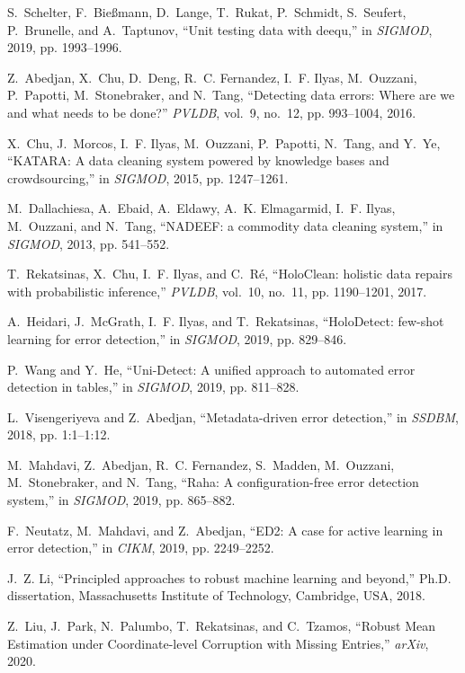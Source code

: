 \documentclass[11pt,dvipsnames]{article}
\begin{document}
\begin{thebibliography}{10}
S.~Schelter, F.~Bie{\ss}mann, D.~Lange, T.~Rukat, P.~Schmidt, S.~Seufert,
  P.~Brunelle, and A.~Taptunov, ``Unit testing data with deequ,'' in
  \emph{SIGMOD}, 2019, pp. 1993--1996.

Z.~Abedjan, X.~Chu, D.~Deng, R.~C. Fernandez, I.~F. Ilyas, M.~Ouzzani,
  P.~Papotti, M.~Stonebraker, and N.~Tang, ``Detecting data errors: Where are
  we and what needs to be done?'' \emph{PVLDB}, vol.~9, no.~12, pp. 993--1004,
  2016.

X.~Chu, J.~Morcos, I.~F. Ilyas, M.~Ouzzani, P.~Papotti, N.~Tang, and Y.~Ye,
  ``{KATARA:} {A} data cleaning system powered by knowledge bases and
  crowdsourcing,'' in \emph{SIGMOD}, 2015, pp. 1247--1261.

M.~Dallachiesa, A.~Ebaid, A.~Eldawy, A.~K. Elmagarmid, I.~F. Ilyas, M.~Ouzzani,
  and N.~Tang, ``{NADEEF:} a commodity data cleaning system,'' in
  \emph{SIGMOD}, 2013, pp. 541--552.

T.~Rekatsinas, X.~Chu, I.~F. Ilyas, and C.~R{\'{e}}, ``{HoloClean:} holistic
  data repairs with probabilistic inference,'' \emph{PVLDB}, vol.~10, no.~11,
  pp. 1190--1201, 2017.

A.~Heidari, J.~McGrath, I.~F. Ilyas, and T.~Rekatsinas, ``{HoloDetect:}
  few-shot learning for error detection,'' in \emph{SIGMOD}, 2019, pp.
  829--846.

P.~Wang and Y.~He, ``{Uni-Detect:} {A} unified approach to automated error
  detection in tables,'' in \emph{SIGMOD}, 2019, pp. 811--828.

L.~Visengeriyeva and Z.~Abedjan, ``Metadata-driven error detection,'' in
  \emph{SSDBM}, 2018, pp. 1:1--1:12.

M.~Mahdavi, Z.~Abedjan, R.~C. Fernandez, S.~Madden, M.~Ouzzani, M.~Stonebraker,
  and N.~Tang, ``Raha: {A} configuration-free error detection system,'' in
  \emph{SIGMOD}, 2019, pp. 865--882.

F.~Neutatz, M.~Mahdavi, and Z.~Abedjan, ``{ED2:} {A} case for active learning
  in error detection,'' in \emph{CIKM}, 2019, pp. 2249--2252.

J.~Z. Li, ``Principled approaches to robust machine learning and beyond,''
  Ph.D. dissertation, Massachusetts Institute of Technology, Cambridge, {USA},
  2018.

Z.~Liu, J.~Park, N.~Palumbo, T.~Rekatsinas, and C.~Tzamos, ``Robust {Mean}
  {Estimation} under {Coordinate}-level {Corruption} with {Missing}
  {Entries},'' \emph{arXiv}, 2020.


\end{thebibliography}
\end{document}
